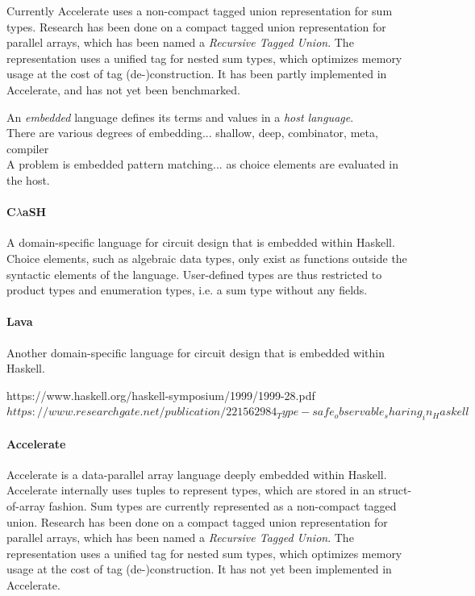 \documentclass{article}
\begin{document}
Currently Accelerate uses a non-compact tagged union representation for sum types.
Research has been done on a compact tagged union representation for parallel arrays, which has been named a {\it Recursive Tagged Union}\cite{accelerate-sum-types}.
The representation uses a unified tag for nested sum types, which optimizes memory usage at the cost of tag (de-)construction.  
It has been partly implemented in Accelerate, and has not yet been benchmarked.

An {\it embedded} language defines its terms and values in a {\it host language}.
\\
There are various degrees of embedding... shallow, deep, combinator, meta, compiler
\\
A problem is embedded pattern matching... as choice elements are evaluated in the host.

\paragraph{C$\lambda$aSH}

A domain-specific language for circuit design that is embedded within Haskell.
Choice elements, such as algebraic data types, only exist as functions outside the syntactic elements of the language.
User-defined types are thus restricted to product types and enumeration types, i.e. a sum type without any fields. \cite{clash}

\paragraph{Lava}

Another domain-specific language for circuit design that is embedded within Haskell.

https://www.haskell.org/haskell-symposium/1999/1999-28.pdf
$https://www.researchgate.net/publication/221562984_Type-safe_observable_sharing_in_Haskell$


\paragraph{Accelerate}

Accelerate is a data-parallel array language deeply embedded within Haskell.
Accelerate internally uses tuples to represent types, which are stored in an struct-of-array fashion.
Sum types are currently represented as a non-compact tagged union.
Research has been done on a compact tagged union representation for parallel arrays, which has been named a {\it Recursive Tagged Union}\cite{accelerate-sum-types}.
The representation uses a unified tag for nested sum types, which optimizes memory usage at the cost of tag (de-)construction.  
It has not yet been implemented in Accelerate.
\end{document}
